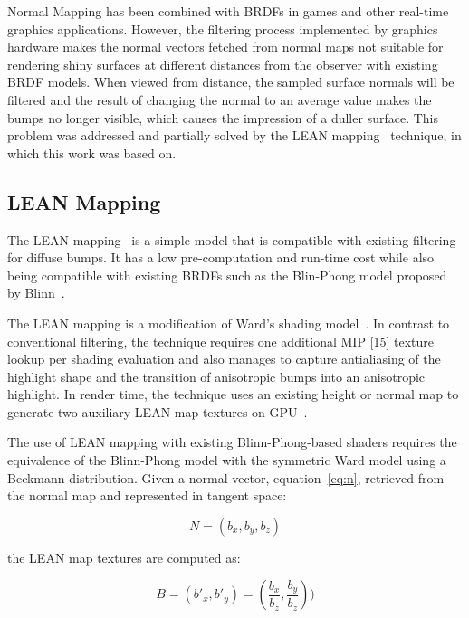 \documentclass[10pt, conference]{IEEEtran}
\begin{document}
Normal Mapping has been combined with BRDFs in games and other real-time graphics applications. However, the filtering process implemented by graphics hardware makes the normal vectors fetched from normal maps not suitable for rendering shiny surfaces at different distances from the observer with existing BRDF models. When viewed from distance, the sampled surface normals will be filtered and the result of changing the normal to an average value makes the bumps no longer visible, which causes the impression of a duller surface. This problem was addressed and partially solved by the LEAN mapping~\cite{Olano:2010:LM:1730804.1730834} technique, in which this work was based on.


\subsection{LEAN Mapping}
%
The LEAN mapping~\cite{Olano:2010:LM:1730804.1730834} is a simple model that is compatible with existing filtering for diffuse bumps. It has a low pre-computation and run-time cost while also being compatible with existing BRDFs such as the Blin-Phong model proposed by Blinn~\cite{Blinn:1977:MLR:563858.563893}.

The LEAN mapping is a modification of Ward’s shading model~\cite{Ward:1992:MMA:133994.134078}. In contrast to conventional filtering, the technique requires one additional MIP [15] texture lookup per shading evaluation and also manages to capture antialiasing of the highlight shape and the transition of anisotropic bumps into an anisotropic highlight. In render time, the technique uses an existing height or normal map to generate two auxiliary LEAN map textures on GPU~\cite{Olano:2010:LM:1730804.1730834}.

The use of LEAN mapping with existing Blinn-Phong-based shaders requires the equivalence of the Blinn-Phong model with the symmetric Ward model using a Beckmann distribution. Given a normal vector, equation~\ref{eq:n}, retrieved from the normal map and represented in tangent space:

\begin{equation}
\label{eq:n}
N = (b_{x}, b_{y}, b_{z})
\end{equation}

the LEAN map textures are computed as:

\begin{equation}
\label{eq:b}
B = (b'_{x}, b'_{y}) = (\dfrac{b_{x}}{b_{z}}, \dfrac{b_{y}}{b_{z}}))
\end{equation}
\end{document}
